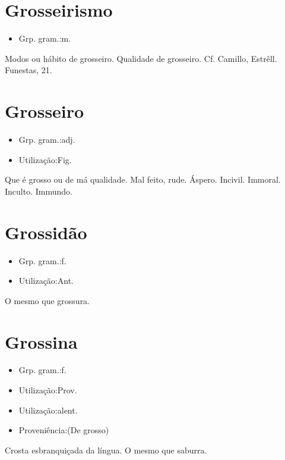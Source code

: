 \section{Grosseirismo}
\begin{itemize}
\item {Grp. gram.:m.}
\end{itemize}
Modos ou hábito de grosseiro.
Qualidade de grosseiro. Cf. Camillo, \textunderscore Estrêll. Funestas\textunderscore , 21.
\section{Grosseiro}
\begin{itemize}
\item {Grp. gram.:adj.}
\end{itemize}
\begin{itemize}
\item {Utilização:Fig.}
\end{itemize}
Que é grosso ou de má qualidade.
Mal feito, rude.
Áspero.
Incivil.
Immoral.
Inculto.
Immundo.
\section{Grossidão}
\begin{itemize}
\item {Grp. gram.:f.}
\end{itemize}
\begin{itemize}
\item {Utilização:Ant.}
\end{itemize}
O mesmo que \textunderscore grossura\textunderscore .
\section{Grossina}
\begin{itemize}
\item {Grp. gram.:f.}
\end{itemize}
\begin{itemize}
\item {Utilização:Prov.}
\end{itemize}
\begin{itemize}
\item {Utilização:alent.}
\end{itemize}
\begin{itemize}
\item {Proveniência:(De \textunderscore grosso\textunderscore )}
\end{itemize}
Crosta esbranquiçada da língua.
O mesmo que \textunderscore saburra\textunderscore .
